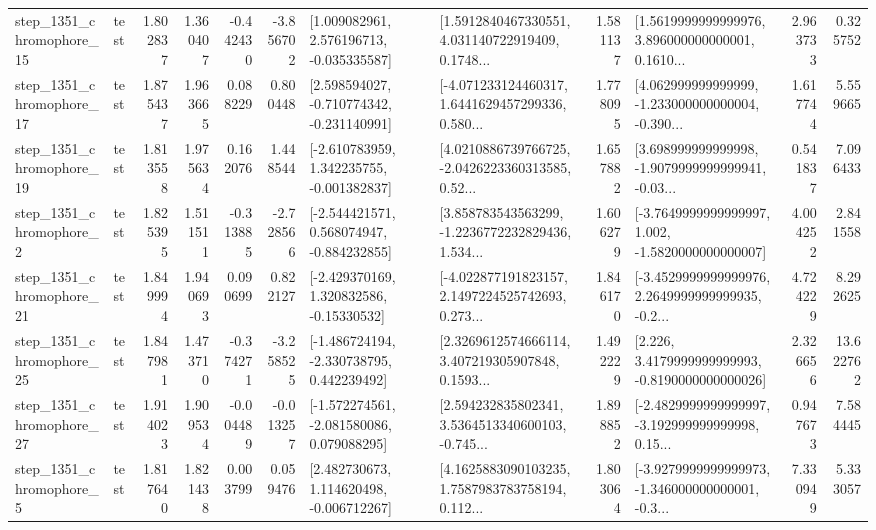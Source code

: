 \begin{tabular}{llrrrrllrlrr}
 step\_1351\_chromophore\_15 &      test &      1.802837 &    1.360407 &     -0.442430 & -3.856702 &    [1.009082961, 2.576196713, -0.035335587] &  [1.5912840467330551, 4.031140722919409, 0.1748... &       1.581137 &  [1.5619999999999976, 3.896000000000001, 0.1610... &            2.963733 &          0.325752 \\
 step\_1351\_chromophore\_17 &      test &      1.875437 &    1.963665 &      0.088229 &  0.800448 &   [2.598594027, -0.710774342, -0.231140991] &  [-4.071233124460317, 1.6441629457299336, 0.580... &       1.778095 &  [4.062999999999999, -1.233000000000004, -0.390... &            1.617744 &          5.559665 \\
 step\_1351\_chromophore\_19 &      test &      1.813558 &    1.975634 &      0.162076 &  1.448544 &   [-2.610783959, 1.342235755, -0.001382837] &  [4.0210886739766725, -2.0426223360313585, 0.52... &       1.657882 &  [3.698999999999998, -1.9079999999999941, -0.03... &            0.541837 &          7.096433 \\
  step\_1351\_chromophore\_2 &      test &      1.825395 &    1.511511 &     -0.313885 & -2.728566 &   [-2.544421571, 0.568074947, -0.884232855] &  [3.858783543563299, -1.2236772232829436, 1.534... &       1.606279 &  [-3.7649999999999997, 1.002, -1.5820000000000007] &            4.004252 &          2.841558 \\
 step\_1351\_chromophore\_21 &      test &      1.849994 &    1.940693 &      0.090699 &  0.822127 &    [-2.429370169, 1.320832586, -0.15330532] &  [-4.022877191823157, 2.1497224525742693, 0.273... &       1.846170 &  [-3.4529999999999976, 2.2649999999999935, -0.2... &            4.724229 &          8.292625 \\
 step\_1351\_chromophore\_25 &      test &      1.847981 &    1.473710 &     -0.374271 & -3.258525 &   [-1.486724194, -2.330738795, 0.442239492] &  [2.3269612574666114, 3.407219305907848, 0.1593... &       1.492229 &   [2.226, 3.4179999999999993, -0.8190000000000026] &            2.326656 &         13.622762 \\
 step\_1351\_chromophore\_27 &      test &      1.914023 &    1.909534 &     -0.004489 & -0.013257 &   [-1.572274561, -2.081580086, 0.079088295] &  [2.594232835802341, 3.5364513340600103, -0.745... &       1.898852 &  [-2.4829999999999997, -3.192999999999998, 0.15... &            0.947673 &          7.584445 \\
  step\_1351\_chromophore\_5 &      test &      1.817640 &    1.821438 &      0.003799 &  0.059476 &    [2.482730673, 1.114620498, -0.006712267] &  [4.1625883090103235, 1.7587983783758194, 0.112... &       1.803064 &  [-3.9279999999999973, -1.346000000000001, -0.3... &            7.330949 &          5.333057 \\

\end{tabular}
